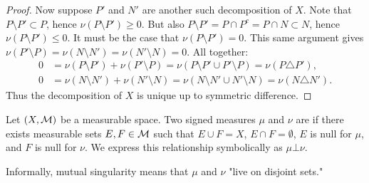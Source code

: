 \begin{proof}
        Now suppose $P'$ and $N'$ are another such decomposition of $X$. Note that $P\setminus P' \subset P$, hence $\nu(P \setminus P') \geq 0$. But also $P \setminus P' = P \cap P^c = P \cap N \subset N$, hence $\nu(P \setminus P') \leq 0$. It must be the case that $\nu(P \setminus P') = 0$. This same argument gives $\nu(P' \setminus P) = \nu(N \setminus N') = \nu(N' \setminus N) = 0$. All together:
            \begin{equation*}
            \begin{split}
                0 & = \nu(P \setminus P') + \nu(P' \setminus P) = \nu(P \setminus P' \cup P' \setminus P) = \nu(P \triangle P'),\\
                0 & = \nu(N \setminus N') + \nu(N' \setminus N) = \nu(N \setminus N' \cup N' \setminus N) = \nu(N \triangle N').
            \end{split}
            \end{equation*}
        Thus the decomposition of $X$ is unique up to symmetric difference.
    \end{proof}

\begin{definition}
    Let $(X,\mathcal{M})$ be a measurable space. Two signed measures $\mu$ and $\nu$ are  if there exists measurable sets $E,F \in \mathcal{M}$ such that $E \cup F = X$, $E \cap F = \emptyset$, $E$ is null for $\mu$, and $F$ is null for $\nu$. We express this relationship symbolically as $\mu \bot \nu$.
\end{definition}

Informally, mutual singularity means that $\mu$ and $\nu$ "live on disjoint sets."

